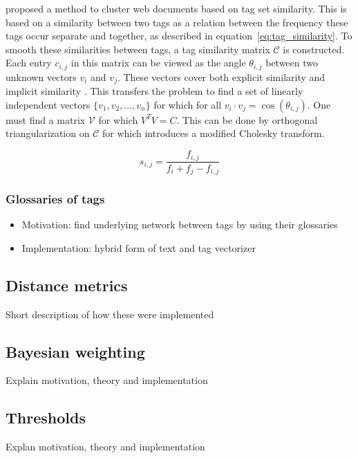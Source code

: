 \citet{zhou2011web} proposed a method to cluster web documents based on tag set similarity. This is based on a similarity between two tags as a relation between the frequency these tags occur separate and together, as described in equation~\ref{eq:tag_similarity}. To smooth these similarities between tags, a tag similarity matrix $\mathcal{C}$ is constructed. Each entry $c_{i,j}$ in this matrix can be viewed as the angle $\theta_{i,j}$ between two unknown vectors $v_i$ and $v_j$. These vectors cover both explicit similarity and implicit similarity \citep{park2010vector}. This transfers the problem to find a set of linearly independent vectors $\{v_1,v_2,\ldots,v_n\}$ for which for all $v_i \cdot v_j = \cos(\theta_{i,j})$. One must find a matrix $\mathcal{V}$ for which $V^TV = C$. This can be done by orthogonal triangularization on $\mathcal{C}$ for which \citeauthor{zhou2011web} introduces a modified Cholesky transform.

\begin{equation} \label{eq:tag_similarity}
s_{i,j} = \frac{f_{i,j}}{f_i + f_j - f_{i,j}}
\end{equation}


\subsubsection{Glossaries of tags}
\begin{itemize}
\item Motivation: find underlying network between tags by using their glossaries
\item Implementation: hybrid form of text and tag vectorizer
\end{itemize}

\subsection{Distance metrics}
Short description of how these were implemented

\subsection{Bayesian weighting}
Explain motivation, theory and implementation 

\subsection{Thresholds}
Explan motivation, theory and implementation